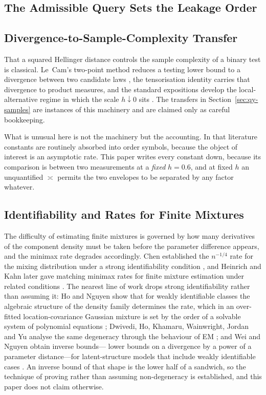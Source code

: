 \documentclass[conference]{IEEEtran}
\theoremstyle{definition}
\begin{document}
\subsection{The Admissible Query Sets the Leakage Order}

\subsection{Divergence-to-Sample-Complexity Transfer}

That a squared Hellinger distance controls the sample complexity of a binary test is
classical. Le~Cam's two-point method reduces a testing lower bound to a divergence between
two candidate laws \cite{lecam1973}, the tensorisation identity carries that divergence to
product measures, and the standard expositions develop the local-alternative regime in which
the scale $h\downarrow0$ sits \cite{tsybakov2009,ibragimov1981}. The transfers in
Section~\ref{sec:qy-samples} are instances of this machinery and are claimed only as careful
bookkeeping.

What is unusual here is not the machinery but the accounting. In that literature constants
are routinely absorbed into order symbols, because the object of interest is an asymptotic
rate. This paper writes every constant down, because its comparison is between two
measurements at a \emph{fixed} $h=0.6$, and at fixed $h$ an unquantified $\asymp$ permits
the two envelopes to be separated by any factor whatever.

\subsection{Identifiability and Rates for Finite Mixtures}

The difficulty of estimating finite mixtures is governed by how many derivatives of the
component density must be taken before the parameter difference appears, and the minimax
rate degrades accordingly. Chen established the $n^{-1/4}$ rate for the mixing distribution
under a strong identifiability condition \cite{chen1995}, and Heinrich and Kahn later gave
matching minimax rates for finite mixture estimation under related conditions
\cite{heinrich2018}. The nearest line of work drops strong identifiability rather than
assuming it: Ho and Nguyen show that for weakly identifiable classes the algebraic structure
of the density family determines the rate, which in an over-fitted location-covariance
Gaussian mixture is set by the order of a solvable system of polynomial equations
\cite{ho2015}; Dwivedi, Ho, Khamaru, Wainwright, Jordan and Yu analyse the same degeneracy
through the behaviour of EM \cite{dwivedi2019}; and Wei and Nguyen obtain inverse bounds---%
lower bounds on a divergence by a power of a parameter distance---for latent-structure
models that include weakly identifiable cases \cite{wei2020}. An inverse bound of that shape
is the lower half of a sandwich, so the technique of proving rather than assuming
non-degeneracy is established, and this paper does not claim otherwise.
\end{document}
